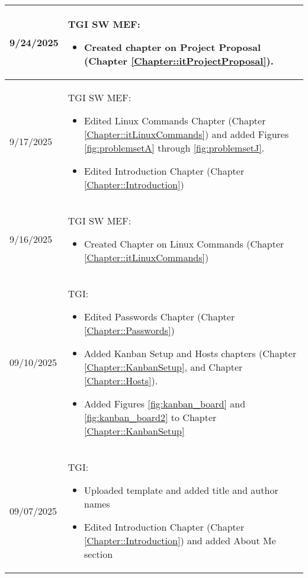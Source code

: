 \begin{longtable}{|l||p{13.5cm}|}
9/24/2025 & TGI SW MEF:
\begin{itemize}[topsep=0pt,itemsep=0pt,parsep=0pt,partopsep=0pt,leftmargin=12pt]
\item Created chapter on Project Proposal (Chapter \ref{Chapter::itProjectProposal}).
\end{itemize}
\\ \hline

9/17/2025 & TGI SW MEF:
\begin{itemize}[topsep=0pt,itemsep=0pt,parsep=0pt,partopsep=0pt,leftmargin=12pt]
\item Edited Linux Commands Chapter (Chapter \ref{Chapter::itLinuxCommands}) and added Figures \ref{fig:problemsetA} through \ref{fig:problemsetJ}.
\item Edited Introduction Chapter (Chapter \ref{Chapter::Introduction})
\end{itemize} 
\\ \hline

9/16/2025 & TGI SW MEF:
\begin{itemize}[topsep=0pt,itemsep=0pt,parsep=0pt,partopsep=0pt,leftmargin=12pt]
\item Created Chapter on Linux Commands (Chapter \ref{Chapter::itLinuxCommands})
\end{itemize} 
\\ \hline

09/10/2025 & TGI:
\begin{itemize}[topsep=0pt,itemsep=0pt,parsep=0pt,partopsep=0pt,leftmargin=12pt]
\item Edited Passwords Chapter (Chapter \ref{Chapter::Passwords})
\item Added Kanban Setup and Hosts chapters (Chapter \ref{Chapter::KanbanSetup}, and Chapter \ref{Chapter::Hosts}).
\item Added Figures \ref{fig:kanban_board} and \ref{fig:kanban_board2} to Chapter \ref{Chapter::KanbanSetup}
\end{itemize} 
\\ \hline

09/07/2025 & TGI:
\begin{itemize}[topsep=0pt,itemsep=0pt,parsep=0pt,partopsep=0pt,leftmargin=12pt]
\item Uploaded template and added title and author names
\item Edited Introduction Chapter (Chapter \ref{Chapter::Introduction}) and added About Me section
\end{itemize} 
\\ \hline



\end{longtable}


